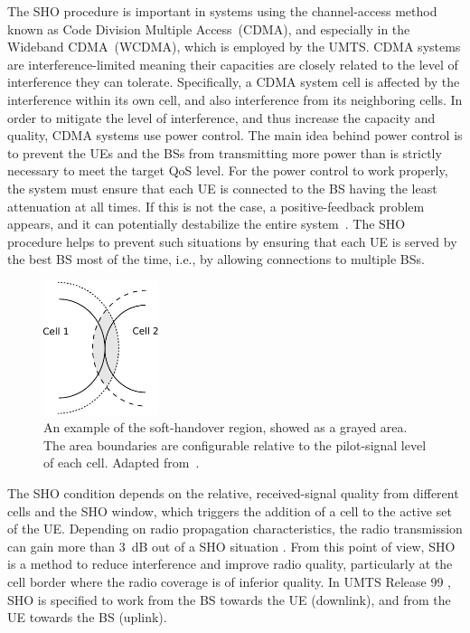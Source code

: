 The SHO procedure is important in systems using the channel-access
method known as Code Division Multiple Access~(CDMA),
and especially in the Wideband CDMA~(WCDMA),
which is employed by the UMTS. CDMA systems are interference-limited
meaning their capacities are closely related to the level of interference
they can tolerate. Specifically, a CDMA system cell is affected by
the interference within its own cell, and also interference from its
neighboring cells. In order to mitigate the level of interference,
and thus increase the capacity and quality, CDMA systems use power
control. The main idea behind power control is to prevent the UEs
and the BSs from transmitting more power than is strictly necessary
to meet the target QoS level. For the power control to work properly,
the system must ensure that each UE is connected to the BS having
the least attenuation at all times. If this is not the case, a positive-feedback
problem appears, and it can potentially destabilize the entire system~\cite{Wong-Soft_handoffs_in_CDMA_mobile_systems:1997}.
The SHO procedure helps to prevent such situations by ensuring that
each UE is served by the best BS most of the time, i.e., by allowing
connections to multiple BSs.

\begin{figure}
\centering

\includegraphics[width=0.3\textwidth]{02-background_and_motivation/img/sho_example}

\caption{An example of the soft-handover region, showed as a grayed area. The
area boundaries are configurable relative to the pilot-signal level
of each cell. Adapted from~\cite{Stuber-Principles_of_mobile_communication:2011}.
\label{fig:02-SHO_example}}
\end{figure}


The SHO condition depends on the relative, received-signal quality
from different cells and the SHO window, which triggers the addition
of a cell to the active set of the UE. Depending on radio propagation
characteristics, the radio transmission can gain more than 3~dB out
of a SHO situation \cite{WCDMAforUMTS_RadioAccessForThirdGenerationMobileCommunications}.
From this point of view, SHO is a method to reduce interference and
improve radio quality, particularly at the cell border where the radio
coverage is of inferior quality. In UMTS Release 99 \cite{3GPP_R99},
SHO is specified to work from the BS towards the UE (downlink), and
from the UE towards the BS (uplink).

